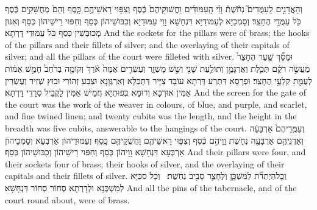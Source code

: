 {וְהָאֲדָנִ֣ים לָֽעַמֻּדִים֮ נְחֹ֒שֶׁת֒ וָוֵ֨י הָֽעַמּוּדִ֜ים וַחֲשׁוּקֵיהֶם֙ כֶּ֔סֶף וְצִפּ֥וּי רָאשֵׁיהֶ֖ם כָּ֑סֶף וְהֵם֙ מְחֻשָּׁקִ֣ים כֶּ֔סֶף כֹּ֖ל עַמֻּדֵ֥י הֶחָצֵֽר׃}
{וְסָמְכַיָּא לְעַמּוּדַיָּא דִּנְחָשָׁא וָוֵי עַמּוּדַיָּא וְכִבּוּשֵׁיהוֹן כְּסַף וְחִפּוּי רֵישֵׁיהוֹן כְּסַף וְאִנּוּן מְכוּבְּשִׁין כְּסַף כֹּל עַמּוּדֵי דָּרְתָא׃}
{And the sockets for the pillars were of brass; the hooks of the pillars and their fillets of silver; and the overlaying of their capitals of silver; and all the pillars of the court were filleted with silver.}{}
{וּמָסַ֞ךְ שַׁ֤עַר הֶחָצֵר֙ מַעֲשֵׂ֣ה רֹקֵ֔ם תְּכֵ֧לֶת וְאַרְגָּמָ֛ן וְתוֹלַ֥עַת שָׁנִ֖י וְשֵׁ֣שׁ מָשְׁזָ֑ר וְעֶשְׂרִ֤ים אַמָּה֙ אֹ֔רֶךְ וְקוֹמָ֤ה בְרֹ֙חַב֙ חָמֵ֣שׁ אַמּ֔וֹת לְעֻמַּ֖ת קַלְעֵ֥י הֶחָצֵֽר׃}
{וּפְרָסָא דִּתְרַע דָּרְתָא עוֹבָד צַיָּיר דְּתַכְלָא וְאַרְגְּוָנָא וּצְבַע זְהוֹרִי וּבוּץ שְׁזִיר וְעֶשְׂרִין אַמִּין אוּרְכָּא וְרוּמָא בְּפוּתְיָא חֲמֵישׁ אַמִּין לָקֳבֵיל סְרָדֵי דָּרְתָא׃}
{And the screen for the gate of the court was the work of the weaver in colours, of blue, and purple, and scarlet, and fine twined linen; and twenty cubits was the length, and the height in the breadth was five cubits, answerable to the hangings of the court.}{}
{וְעַמֻּֽדֵיהֶם֙ אַרְבָּעָ֔ה וְאַדְנֵיהֶ֥ם אַרְבָּעָ֖ה נְחֹ֑שֶׁת וָוֵיהֶ֣ם כֶּ֔סֶף וְצִפּ֧וּי רָאשֵׁיהֶ֛ם וַחֲשֻׁקֵיהֶ֖ם כָּֽסֶף׃}
{וְעַמּוּדֵיהוֹן אַרְבְּעָא וְסָמְכֵיהוֹן אַרְבְּעָא דִּנְחָשָׁא וָוֵיהוֹן כְּסַף וְחִפּוּי רֵישֵׁיהוֹן וְכִבּוּשֵׁיהוֹן כְּסַף׃}
{And their pillars were four, and their sockets four of brass; their hooks of silver, and the overlaying of their capitals and their fillets of silver.}{}
{וְֽכׇל\maqqaf הַיְתֵדֹ֞ת לַמִּשְׁכָּ֧ן וְלֶחָצֵ֛ר סָבִ֖יב נְחֹֽשֶׁת׃ \setuma }
{וְכָל סִכַּיָּא לְמַשְׁכְּנָא וּלְדָרְתָא סְחוֹר סְחוֹר דִּנְחָשָׁא׃}
{And all the pins of the tabernacle, and of the court round about, were of brass.}{}
